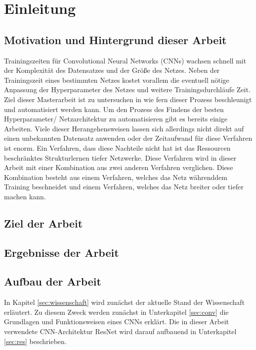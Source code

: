\chapter{Einleitung}
\label{sec:EinleitungGesamt}

\section{Motivation und Hintergrund dieser Arbeit}






Trainingszeiten für Convolutional Neural Networks (CNNs) wachsen schnell mit der Komplexität des Datensatzes und der Größe des Netzes. Neben der Trainingszeit eines bestimmten Netzes kostet vorallem die eventuell nötige Anpassung der Hyperparameter des Netzes und weitere Trainingsdurchläufe Zeit. Ziel dieser Masterarbeit ist zu untersuchen in wie fern dieser Prozess beschleunigt und automatisiert werden kann. Um den Prozess des Findens der besten Hyperparameter/ Netzarchitektur zu automatisieren gibt es bereits einige Arbeiten. Viele dieser Herangehensweisen lassen sich allerdings nicht direkt auf einen unbekannten Datensatz anwenden oder der Zeitaufwand für diese Verfahren ist enorm. Ein Verfahren, dass diese Nachteile nicht hat ist das Ressourcen beschränktes Strukturlernen tiefer Netzwerke. Diese Verfahren wird in dieser Arbeit mit einer Kombination aus zwei anderen Verfahren verglichen. Diese Kombination besteht aus einem Verfahren, welches das Netz währenddem Training beschneidet und einem Verfahren, welches das Netz breiter oder tiefer machen kann.

\section{Ziel der Arbeit}




\section{Ergebnisse der Arbeit}


\section{Aufbau der Arbeit}
In Kapitel \ref{sec:wissenschaft} wird zunächst der aktuelle Stand der Wissenschaft erläutert. Zu diesem Zweck werden zunächst in Unterkapitel \ref{sec:conv} die Grundlagen und Funktionsweisen eines CNNs erklärt. Die in dieser Arbeit verwendete CNN-Architektur ResNet wird darauf aufbauend in Unterkapitel \ref{sec:res} beschrieben.


